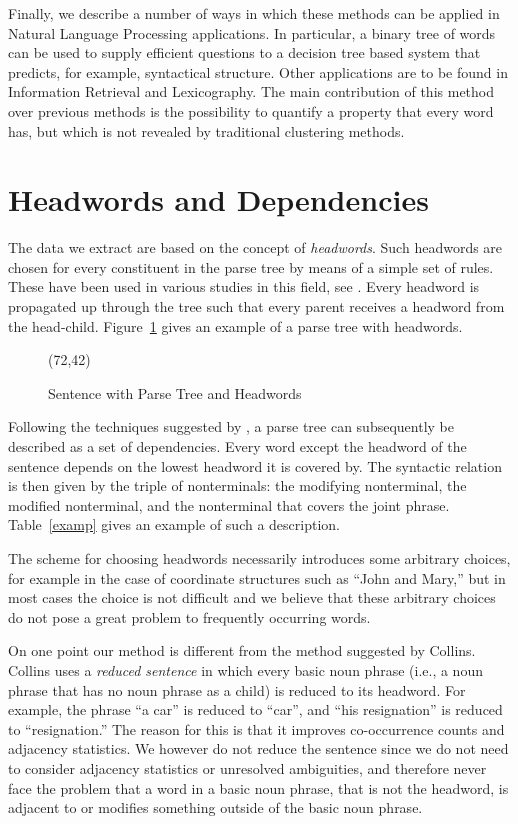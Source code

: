Finally, we describe a number of ways in which these methods can be applied in
Natural Language Processing applications. In particular, a binary tree of words
can be used to supply efficient questions to a decision tree based system that
predicts, for example, syntactical structure. Other applications are to be found
in Information Retrieval and Lexicography. The main contribution of this method
over previous methods is the possibility to quantify a property that every word
has, but which is not revealed by traditional clustering methods.

\section{Headwords and Dependencies} \label{hadsec}

The data we extract are based on the concept of {\em headwords}.  Such
headwords are chosen for every constituent in the parse tree by means
of a simple set of rules. These have been used in various studies in
this field, see
\cite{charniak97,collins96,magerman:acl,ik:boek,jelinek94}.  Every
headword is propagated up through the tree such that every parent
receives a headword from the head-child.  Figure~\ref{treesam} gives
an example of a parse tree with headwords.

\begin{figure}[t]
\begin{center}
\atari(72,42)
\caption{Sentence with Parse Tree and Headwords}
\label{treesam}
\end{center}
\end{figure}

Following the techniques suggested by \cite{collins96}, a parse tree
can subsequently be described as a set of dependencies.  Every word
except the headword of the sentence depends on the lowest headword it
is covered by. The syntactic relation is then given by the triple of
nonterminals: the modifying nonterminal, the modified nonterminal, and
the nonterminal that covers the joint phrase. Table~\ref{examp} gives
an example of such a description.

The scheme for choosing headwords necessarily introduces some
arbitrary choices, for example in the case of coordinate structures
such as ``John and Mary,'' but in most cases the choice is not
difficult and we believe that these arbitrary choices do not pose a
great problem to frequently occurring words.

On one point our method is different from the method suggested by Collins.
Collins uses a {\em reduced sentence} in which every basic noun phrase (i.e., a
noun phrase that has no noun phrase as a child) is reduced to its headword.  For
example, the phrase ``a car'' is reduced to ``car'', and ``his resignation'' is
reduced to ``resignation.''  The reason for this is that it improves
co-occurrence counts and adjacency statistics. We however do not reduce the
sentence since we do not need to consider adjacency statistics or unresolved
ambiguities, and therefore never face the problem that a word in a basic noun
phrase, that is not the headword, is adjacent to or modifies something outside
of the basic noun phrase.


